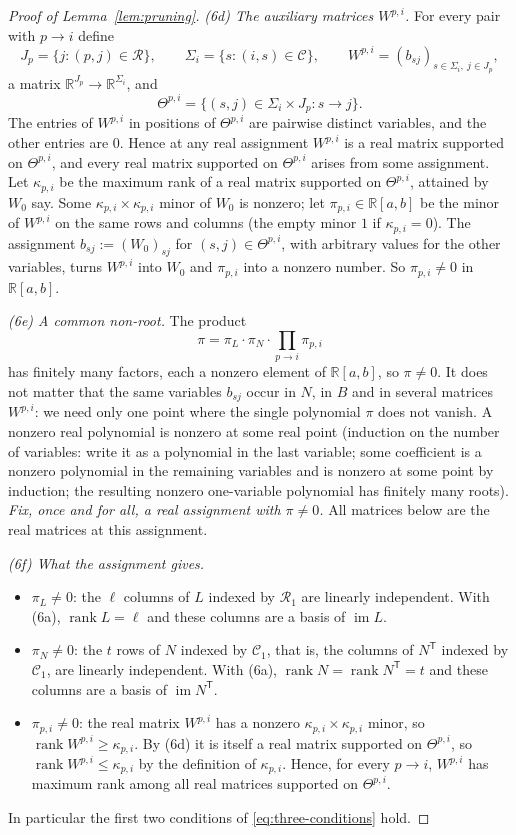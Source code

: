 \documentclass[11pt]{article}
\theoremstyle{remark}
\DeclareMathOperator{\rank}{rank}
\DeclareMathOperator{\im}{im}
\newcommand{\R}{\mathbb R}
\newcommand{\tp}{^{\mathsf T}}
\newcommand{\cR}{\mathcal R}
\newcommand{\cC}{\mathcal C}
\begin{document}
\begin{proof}[Proof of Lemma~\ref{lem:pruning}]
\smallskip\noindent\emph{(6d) The auxiliary matrices $W^{p,i}$.}
For every pair with $p\to i$ define
\[
 J_p=\{j:(p,j)\in\mathcal R\},\qquad
 \Sigma_i=\{s:(i,s)\in\mathcal C\},\qquad
 W^{p,i}=(b_{sj})_{s\in \Sigma_i,\ j\in J_p},
\]
a matrix $\R^{J_p}\to\R^{\Sigma_i}$, and
\[
 \Theta^{p,i}=\{(s,j)\in \Sigma_i\times J_p:s\to j\}.
\]
The entries of $W^{p,i}$ in positions of $\Theta^{p,i}$ are pairwise
distinct variables, and the other entries are $0$. Hence at any real
assignment $W^{p,i}$ is a real matrix supported on $\Theta^{p,i}$, and every
real matrix supported on $\Theta^{p,i}$ arises from some assignment. Let
$\kappa_{p,i}$ be the maximum rank of a real matrix supported on
$\Theta^{p,i}$, attained by $W_0$ say. Some
$\kappa_{p,i}\times\kappa_{p,i}$ minor of $W_0$ is nonzero; let
$\pi_{p,i}\in\R[a,b]$ be the minor of $W^{p,i}$ on the same rows and
columns (the empty minor $1$ if $\kappa_{p,i}=0$). The assignment
$b_{sj}:=(W_0)_{sj}$ for $(s,j)\in\Theta^{p,i}$, with arbitrary values for
the other variables, turns $W^{p,i}$ into $W_0$ and $\pi_{p,i}$ into a
nonzero number. So $\pi_{p,i}\ne0$ in $\R[a,b]$.

\smallskip\noindent\emph{(6e) A common non-root.}
The product
\[
 \pi=\pi_L\cdot\pi_N\cdot\prod_{p\to i}\pi_{p,i}
\]
has finitely many factors, each a nonzero element of $\R[a,b]$, so
$\pi\ne0$. It does not matter that the same variables $b_{sj}$ occur in $N$,
in $B$ and in several matrices $W^{p,i}$: we need only one point where the
single polynomial $\pi$ does not vanish. A nonzero real polynomial is
nonzero at some real point (induction on the number of variables: write it
as a polynomial in the last variable; some coefficient is a nonzero
polynomial in the remaining variables and is nonzero at some point by
induction; the resulting nonzero one-variable polynomial has finitely many
roots). \emph{Fix, once and for all, a real assignment with $\pi\ne0$.}
All matrices below are the real matrices at this assignment.

\smallskip\noindent\emph{(6f) What the assignment gives.}
\begin{itemize}[leftmargin=2.5em]
\item[(G1)] $\pi_L\ne0$: the $\ell$ columns of $L$ indexed by $\cR_1$ are
linearly independent. With (6a), $\rank L=\ell$ and these columns are a
basis of $\im L$.
\item[(G2)] $\pi_N\ne0$: the $t$ rows of $N$ indexed by $\cC_1$, that is,
the columns of $N\tp$ indexed by $\cC_1$, are linearly independent. With
(6a), $\rank N=\rank N\tp=t$ and these columns are a basis of $\im N\tp$.
\item[(G3)] $\pi_{p,i}\ne0$: the real matrix $W^{p,i}$ has a nonzero
$\kappa_{p,i}\times\kappa_{p,i}$ minor, so $\rank W^{p,i}\ge\kappa_{p,i}$.
By (6d) it is itself a real matrix supported on $\Theta^{p,i}$, so
$\rank W^{p,i}\le\kappa_{p,i}$ by the definition of $\kappa_{p,i}$. Hence,
for every $p\to i$, $W^{p,i}$ has maximum rank among all real matrices
supported on $\Theta^{p,i}$.
\end{itemize}
In particular the first two conditions of \eqref{eq:three-conditions} hold.


\end{proof}
\end{document}
